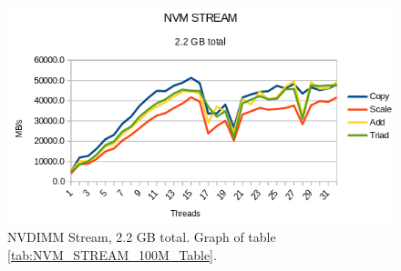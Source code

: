 \documentclass[12pt,a4paper,USenglish]{article}      %
\begin{document}
\begin{figure}[!hbtp]
\includegraphics[scale=0.7]{Benchmarks/NVM_STREAM_100M_Figure.png}
\caption{NVDIMM Stream, 2.2 GB total. Graph of table \ref{tab:NVM_STREAM_100M_Table}.}
\label{fig:NVM_STREAM_100M_Figure}
\end{figure}
\end{document}
